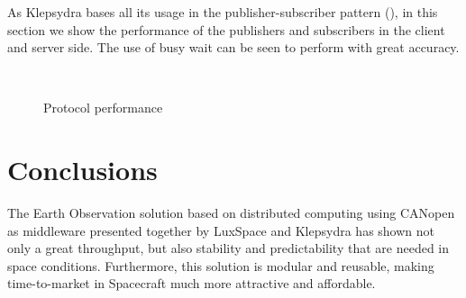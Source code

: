 \documentclass[a4paper,twocolumn]{esapub2005} %
\begin{document}
As Klepsydra bases all its usage in the publisher-subscriber pattern (\cite{Douglass2010DPEmbeddedSysinC}), in this section we show the performance of the publishers and subscribers in the client and server side. The use of busy wait can be seen to perform with great accuracy.

\begin{figure}[!htbp]
  \centering
  \\
  \caption{\label{ref_label_overall}Protocol performance}
\end{figure}

\section{Conclusions}
The Earth Observation solution based on distributed computing using CANopen as middleware presented together by LuxSpace and Klepsydra has shown not only a great throughput, but also stability and predictability that are needed in space conditions. Furthermore, this solution is modular and reusable, making time-to-market in Spacecraft much more attractive and affordable.
\end{document}
